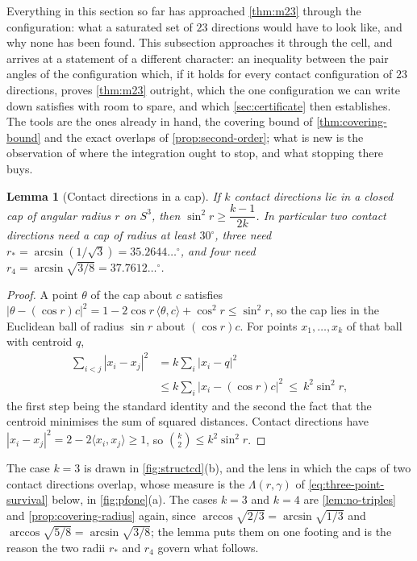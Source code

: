 \documentclass[11pt,reqno]{amsart}
\renewcommand{\_}{\origunderscore\allowbreak}
\numberwithin{equation}{section}
\theoremstyle{plain}
\newtheorem{lem}[thm]{Lemma}
\theoremstyle{definition}
\theoremstyle{remark}
\begin{document}
Everything in this section so far has approached \cref{thm:m23} through
the configuration: what a saturated set of $23$ directions would have
to look like, and why none has been found. This subsection approaches
it through the cell, and arrives at a statement of a different
character: an inequality between the pair angles of the configuration
which, if it holds for every contact configuration of $23$ directions,
proves \cref{thm:m23} outright, which the one configuration we can write
down satisfies with room to spare, and which \cref{sec:certificate}
then establishes. The tools are the ones already in
hand, the covering bound of \cref{thm:covering-bound} and the exact
overlaps of \cref{prop:second-order}; what is new is the observation of
where the integration ought to stop, and what stopping there buys.

\begin{lem}[Contact directions in a cap]\label{lem:cap-count}
If $k$ contact directions lie in a closed cap of angular radius $r$ on
$S^3$, then $\sin^2r\ge\dfrac{k-1}{2k}$. In particular two contact
directions need a cap of radius at least $30^\circ$, three need
$r_*=\arcsin(1/\sqrt3)=35.2644\ldots^\circ$, and four need
$r_4=\arcsin\sqrt{3/8}=37.7612\ldots^\circ$.
\end{lem}

\begin{proof}
A point $\theta$ of the cap about $c$ satisfies
$|\theta-(\cos r)c|^2=1-2\cos r\,\langle\theta,c\rangle+\cos^2r\le\sin^2r$,
so the cap lies in the Euclidean ball of radius $\sin r$ about
$(\cos r)c$. For points $x_1,\dots,x_k$ of that ball with centroid $q$,
\[
\begin{aligned}
  \sum_{i<j}|x_i-x_j|^2 &= k\sum_i|x_i-q|^2\\
  &\le k\sum_i|x_i-(\cos r)c|^2\ \le\ k^2\sin^2r ,
\end{aligned}
\]
the first step being the standard identity and the second the fact
that the centroid minimises the sum of squared distances. Contact
directions have $|x_i-x_j|^2=2-2\langle x_i,x_j\rangle\ge1$, so
$\binom k2\le k^2\sin^2r$.
\end{proof}

The case $k=3$ is drawn in \cref{fig:structcd}(b), and the
lens in which the caps of two contact directions overlap, whose measure
is the $\Lambda(r,\gamma)$ of \eqref{eq:three-point-survival} below, in
\cref{fig:pfone}(a). The cases $k=3$ and $k=4$ are \cref{lem:no-triples} and
\cref{prop:covering-radius} again, since
$\arccos\sqrt{2/3}=\arcsin\sqrt{1/3}$ and
$\arccos\sqrt{5/8}=\arcsin\sqrt{3/8}$; the lemma puts them on one
footing and is the reason the two radii $r_*$ and $r_4$ govern what
follows.
\end{document}
